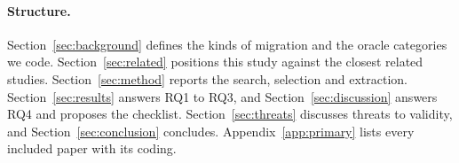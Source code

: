 \begin{added}
\paragraph{Structure.} Section~\ref{sec:background} defines the kinds of migration and the oracle categories we code. Section~\ref{sec:related} positions this study against the closest related studies. Section~\ref{sec:method} reports the search, selection and extraction. Section~\ref{sec:results} answers RQ1 to RQ3, and Section~\ref{sec:discussion} answers RQ4 and proposes the checklist. Section~\ref{sec:threats} discusses threats to validity, and Section~\ref{sec:conclusion} concludes. Appendix~\ref{app:primary} lists every included paper with its coding.
\end{added}
